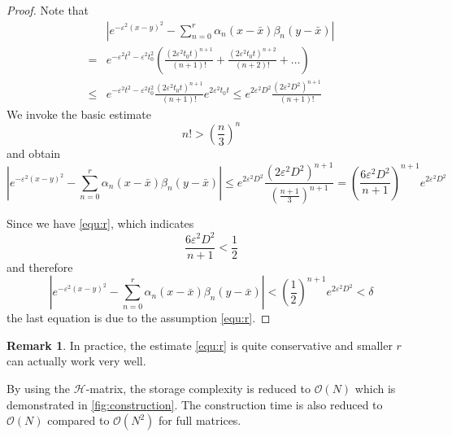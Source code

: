 \documentclass[10pt,a4paper]{article}
\theoremstyle{definition}
\newtheorem{remark}{Remark}
\begin{document}
\begin{proof}
	Note that 
	\begin{align}
		&|{e^{ - {\varepsilon ^2}{{(x - y)}^2}}} - \sum\limits_{n = 0}^r {{\alpha _n}} (x - \bar x){\beta _n}(y - \bar x)|\\
		 =&  {e^{ - {\varepsilon ^2}{t^2} - {\varepsilon ^2}t_0^2}}\left( {\frac{{{{(2{\varepsilon ^2}{t_0}t)}^{n + 1}}}}{{(n + 1)!}} + \frac{{{{(2{\varepsilon ^2}{t_0}t)}^{n + 2}}}}{{(n + 2)!}} +  \ldots } \right)\\
		\le& {e^{ - {\varepsilon ^2}{t^2} - {\varepsilon ^2}t_0^2}}\frac{{{{(2{\varepsilon ^2}{t_0}t)}^{n + 1}}}}{{(n + 1)!}}{e^{2{\varepsilon ^2}{t_0}t}} \le {e^{2{\varepsilon ^2}{D^2}}}\frac{{{{(2{\varepsilon ^2}{D^2})}^{n + 1}}}}{{(n + 1)!}}
	\end{align}
	We invoke the basic estimate
	\begin{equation}
		n!>\left( \frac{n}{3} \right)^{n}
	\end{equation} 
	and obtain
	\begin{equation}
		|{e^{ - {\varepsilon ^2}{{(x - y)}^2}}} - \sum\limits_{n = 0}^r {{\alpha _n}} (x - \bar x){\beta _n}(y - \bar x)|\leq {e^{2{\varepsilon ^2}{D^2}}}\frac{{{{(2{\varepsilon ^2}{D^2})}^{n + 1}}}}{{{{\left( {\frac{{n + 1}}{3}} \right)}^{n + 1}}}} = {\left( {\frac{{6{\varepsilon ^2}{D^2}}}{{n + 1}}} \right)^{n + 1}}{e^{2{\varepsilon ^2}{D^2}}}
	\end{equation}
	
	Since we have \cref{equ:r}, which indicates 
	\begin{equation}
		{\frac{{6{\varepsilon ^2}{D^2}}}{{n + 1}}}<\frac{1}{2}
	\end{equation}
	and therefore
	\begin{equation}
		|{e^{ - {\varepsilon ^2}{{(x - y)}^2}}} - \sum\limits_{n = 0}^r {{\alpha _n}} (x - \bar x){\beta _n}(y - \bar x)| < {\left( {\frac{1}{2}} \right)^{n + 1}}{e^{2{\varepsilon ^2}{D^2}}} < \delta 
	\end{equation}
	the last equation is due to the assumption \cref{equ:r}.
\end{proof}

\begin{remark}
	In practice, the estimate \cref{equ:r} is quite conservative and smaller $r$ can actually work very well. 
\end{remark}

By using the $\mathcal{H}$-matrix, the storage complexity is reduced to $\mathcal{O}(N)$ which is demonstrated in \cref{fig:construction}. The construction time is also reduced to $\mathcal{O}(N)$ compared to $\mathcal{O}(N^2)$ for full matrices. 
\end{document}

